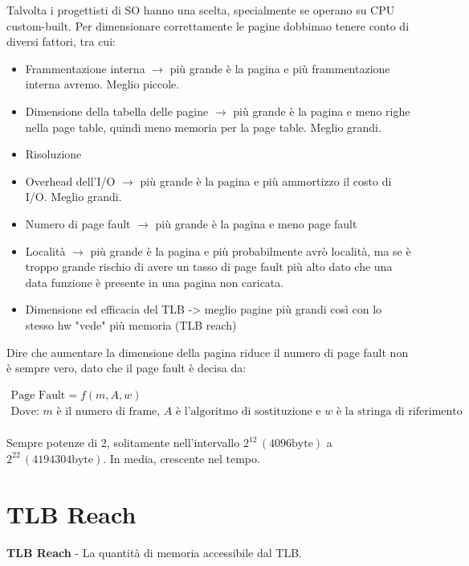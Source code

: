 Talvolta i progettisti di SO hanno una scelta, specialmente se operano su CPU custom-built.
Per dimensionare correttamente le pagine dobbimao tenere conto di diversi fattori, tra cui:


\begin{itemize}
  \item Frammentazione interna $\to$ più grande è la pagina e più frammentazione interna avremo. Meglio piccole.
  \item Dimensione della tabella delle pagine $\to$ più grande è la pagina e meno righe nella page table, quindi meno memoria per la page table. Meglio grandi.
  \item Risoluzione
  \item Overhead dell'I/O $\to$ più grande è la pagina e più ammortizzo il costo di I/O. Meglio grandi.
  \item Numero di page fault $\to$ più grande è la pagina e meno page fault
  \item Località $\to$ più grande è la pagina e più probabilmente avrò località, ma se è troppo grande rischio di avere un tasso di page fault più alto dato che una data funzione è presente in una pagina non caricata.
  \item Dimensione ed efficacia del TLB -> meglio pagine più grandi così con lo stesso hw "vede" più memoria (TLB reach)
\end{itemize}

Dire che aumentare la dimensione della pagina riduce il numero di page fault non è sempre vero,
dato che il page fault è decisa da:

\begin{gather*}
  \text{Page Fault} = f(m, A, w) \\
  \text{Dove: } \textit{m} \text{ è il numero di frame, } \textit{A} \text{ è l'algoritmo di sostituzione e } \textit{w} \text{ è la stringa di riferimento}
\end{gather*}

\paragraph{}


Sempre potenze di 2, solitamente nell'intervallo $2^{12}\,(4096 \text{byte})$ a $2^{22}\,(4194304 \text{byte})$.
In media, crescente nel tempo.

\section{TLB Reach}
\textbf{TLB Reach} - La quantità di memoria accessibile dal TLB.

